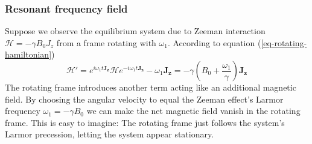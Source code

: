 \documentclass[11.5pt,a4paper]{article}
\begin{document}

\subsubsection{Resonant frequency field}
Suppose we observe the equilibrium system due to Zeeman interaction $\mathcal{H} = - \gamma B_0 J_z$ from a frame rotating with $\omega_1$. According to equation (\ref{eq-rotating-hamiltonian})
\begin{equation}
  \mathcal{H'} = e^{i \omega_1 t \mathbf{J_z}} \mathcal{H} e^{-i \omega_1 t \mathbf{J_z}}- \omega_1 \mathbf{J_z} = -\gamma(B_0 + \frac{\omega_1}{\gamma}) \mathbf{J_z}
\end{equation}
The rotating frame introduces another term acting like an additional magnetic field. By choosing the angular velocity to equal the Zeeman effect's Larmor frequency $\omega_1 = -\gamma B_0$ we can make the net magnetic field vanish in the rotating frame. This is easy to imagine: The rotating frame just follows the system's Larmor precession, letting the system appear stationary.
\end{document}
